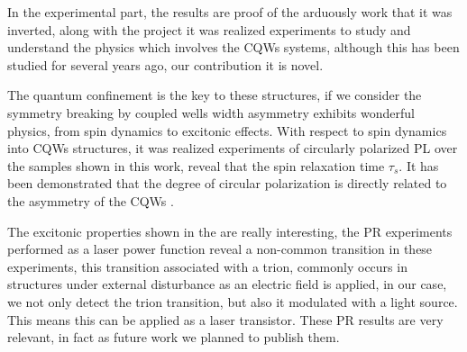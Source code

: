 In the experimental part, the results are proof of the arduously work that it was inverted, along with the project it was realized experiments to study and understand the physics which involves the CQWs systems, although this has been studied for several years ago, our contribution it is novel.

The quantum confinement is the key to these structures, if we consider the symmetry breaking by coupled wells width asymmetry exhibits wonderful physics, from spin dynamics to excitonic effects. With respect to spin dynamics into CQWs structures, it was realized
experiments of circularly polarized PL over the samples shown in this work, reveal that the
spin relaxation time $\tau_s$. It has been demonstrated that the degree of circular polarization is directly related to the asymmetry of the CQWs \cite{bravo2022photoluminiscence}.

The excitonic properties shown in the  are really interesting, the PR
experiments performed as a laser power function reveal a non-common transition in these experiments, this transition associated with a trion, commonly occurs in structures under external disturbance as an electric field is applied, in our case, we not only detect the trion transition, but also it modulated with a light source. This means this can be applied as a laser transistor. These \gls{PR} results are very relevant, in fact as future work we planned
to publish them.

